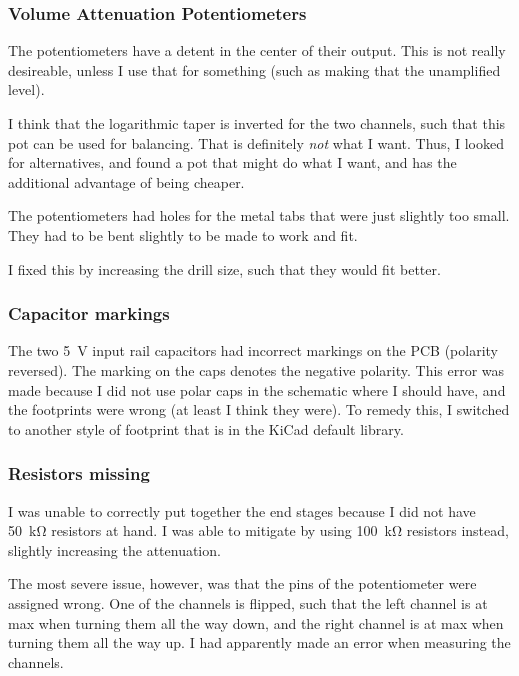 \documentclass[a4paper]{article}
\begin{document}

\subsubsection{Volume Attenuation Potentiometers}

The potentiometers have a detent in the center of their output. This is not really desireable, unless I use that for something (such as making that the unamplified level).

I think that the logarithmic taper is inverted for the two channels, such that this pot can be used for balancing. That is definitely \emph{not} what I want. Thus, I looked for alternatives, and found a pot that might do what I want, and has the additional advantage of being cheaper.



The potentiometers had holes for the metal tabs that were just slightly too small. They had to be bent slightly to be made to work and fit. 

I fixed this by increasing the drill size, such that they would fit better.

\subsubsection{Capacitor markings}

The two \SI{5}{\volt} input rail capacitors had incorrect markings on the PCB (polarity reversed). The marking on the caps denotes the negative polarity. This error was made because I did not use polar caps in the schematic where I should have, and the footprints were wrong (at least I think they were). To remedy this, I switched to another style of footprint that is in the KiCad default library.

\subsubsection{Resistors missing}

I was unable to correctly put together the end stages because I did not have \SI{50}{\kilo\ohm} resistors at hand. I was able to mitigate by using \SI{100}{\kilo\ohm} resistors instead, slightly increasing the attenuation. 

The most severe issue, however, was that the pins of the potentiometer were assigned wrong. One of the channels is flipped, such that the left channel is at max when turning them all the way down, and the right channel is at max when turning them all the way up. I had apparently made an error when measuring the channels.
\end{document}
